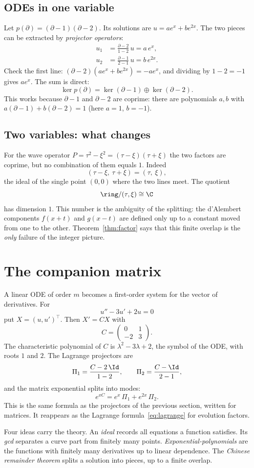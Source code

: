 \subsection{ODEs in one variable}

Let $p(\partial)=(\partial-1)(\partial-2)$. Its solutions are $u=ae^x+be^{2x}$. The two pieces can be extracted by \emph{projector operators}:
\begin{align*}
u_1&=\frac{\partial-2}{1-2}\,u=a\,e^{x},\\[3pt]
u_2&=\frac{\partial-1}{2-1}\,u=b\,e^{2x}.
\end{align*}
Check the first line: $(\partial-2)(ae^x+be^{2x})=-ae^x$, and dividing by $1-2=-1$ gives $ae^x$. The sum is direct:
\[
\ker p(\partial)=\ker(\partial-1)\oplus\ker(\partial-2).
\]
This works because $\partial-1$ and $\partial-2$ are coprime: there are polynomials $a,b$ with $a(\partial-1)+b(\partial-2)=1$ (here $a=1$, $b=-1$).

\subsection{Two variables: what changes}

For the wave operator $P=\tau^2-\xi^2=(\tau-\xi)(\tau+\xi)$ the two factors are coprime, but no combination of them equals $1$. Indeed
\[
(\tau-\xi,\ \tau+\xi)=(\tau,\ \xi),
\]
the ideal of the single point $(0,0)$ where the two lines meet. The quotient
\[
\ring/(\tau,\xi)\cong\C
\]
has dimension $1$. This number is the ambiguity of the splitting: the d'Alembert components $f(x+t)$ and $g(x-t)$ are defined only up to a constant moved from one to the other. Theorem~\ref{thm:factor} says that this finite overlap is the \emph{only} failure of the integer picture.

\section{The companion matrix}\label{sec:pr-comp}

A linear ODE of order $m$ becomes a first-order system for the vector of derivatives. For
\[
u''-3u'+2u=0
\]
put $X=(u,u')^{\top}$. Then $X'=CX$ with
\[
C=\begin{pmatrix}0&1\\-2&3\end{pmatrix}.
\]
The characteristic polynomial of $C$ is $\lambda^2-3\lambda+2$, the symbol of the ODE, with roots $1$ and $2$. The Lagrange projectors are
\[
\Pi_1=\frac{C-2\,\Id}{1-2},\qquad \Pi_2=\frac{C-\Id}{2-1},
\]
and the matrix exponential splits into modes:
\[
e^{xC}=e^{x}\,\Pi_1+e^{2x}\,\Pi_2 .
\]
This is the same formula as the projectors of the previous section, written for matrices. It reappears as the Lagrange formula~\eqref{eq:lagrange} for evolution factors.

\begin{keypoint}
Four ideas carry the theory. An \emph{ideal} records all equations a function satisfies. Its \emph{gcd} separates a curve part from finitely many points. \emph{Exponential-polynomials} are the functions with finitely many derivatives up to linear dependence. The \emph{Chinese remainder theorem} splits a solution into pieces, up to a finite overlap.
\end{keypoint}
